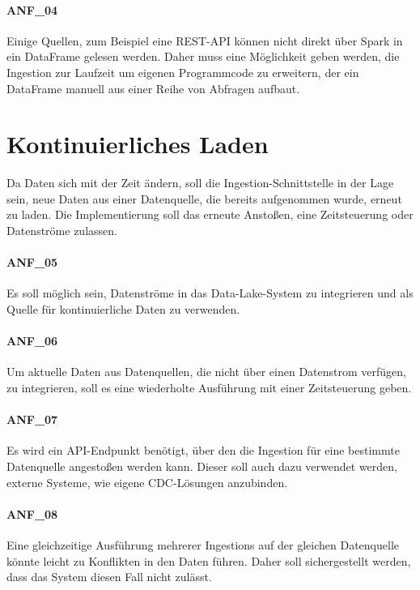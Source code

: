 \paragraph{ANF\_04}
\label{ANF_04}
Einige Quellen, zum Beispiel eine REST-API können nicht direkt über Spark in ein DataFrame gelesen werden.
Daher muss eine Möglichkeit geben werden, die Ingestion zur Laufzeit um eigenen Programmcode zu erweitern, der ein DataFrame manuell aus einer Reihe von Abfragen aufbaut.

\section{Kontinuierliches Laden}
\label{sec:anf-ci}
Da Daten sich mit der Zeit ändern, soll die Ingestion-Schnittstelle in der Lage sein, neue Daten aus einer Datenquelle, die bereits aufgenommen wurde, erneut zu laden.
Die Implementierung soll das erneute Anstoßen, eine Zeitsteuerung oder Datenströme zulassen.

\paragraph{ANF\_05}
\label{ANF_05}
Es soll möglich sein, Datenströme in das Data-Lake-System zu integrieren und als Quelle für kontinuierliche Daten zu verwenden.

\paragraph{ANF\_06}
\label{ANF_06}
Um aktuelle Daten aus Datenquellen, die nicht über einen Datenstrom verfügen, zu integrieren, soll es eine  wiederholte Ausführung mit einer Zeitsteuerung geben.

\paragraph{ANF\_07}
\label{ANF_07}
Es wird ein API-Endpunkt benötigt, über den die Ingestion für eine bestimmte Datenquelle angestoßen werden kann.
Dieser soll auch dazu verwendet werden, externe Systeme, wie eigene CDC-Lösungen anzubinden.

\paragraph{ANF\_08}
\label{ANF_08}
Eine gleichzeitige Ausführung mehrerer Ingestions auf der gleichen Datenquelle könnte leicht zu Konflikten in den Daten führen.
Daher soll sichergestellt werden, dass das System diesen Fall nicht zulässt.


